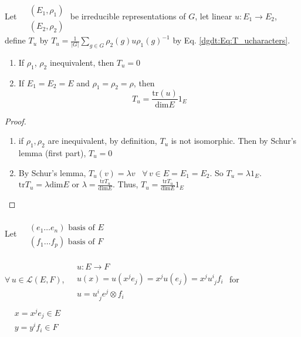 \begin{proposition}
	Let $\begin{aligned}
	& \quad \\
	& (E_1,\rho_1) \\
	& (E_2,\rho_2) \end{aligned}$ be irreducible representations of $G$, let linear $u:E_1 \to E_2$, define $T_u$ by $T_u = \frac{1}{ |G|} \sum_{g\in G} \rho_2(g) u \rho_1(g)^{-1}$ by Eq. \ref{dgdt:Eq:T_ucharacters}.  
	
	\begin{enumerate}
		\item[(i)] If $\rho_1$, $\rho_2$ inequivalent, then $T_u=0$
		\item[(ii)] If $E_1=E_2= E$ and $\rho_1 = \rho_2 = \rho$, then
		\[
		T_u = \frac{\text{tr}{(u)}}{ \text{dim}E} 1_E
		\]
	\end{enumerate}
\end{proposition}

\begin{proof}
	\begin{enumerate}
		\item[(i)] if $\rho_1,\rho_2$ are inequivalent, by definition, $T_u$ is not isomorphic.  Then by Schur's lemma (first part), $T_u=0$
		\item[(ii)] By Schur's lemma, $T_u(v) = \lambda v$ \, $\forall \, v \in E = E_1 = E_2$.  So $T_u = \lambda 1_E$.  $\text{tr}T_u = \lambda \text{dim}E$ or $\lambda = \frac{ \text{tr}T_u}{ \text{dim}E}$.  Thus, $T_u = \frac{\text{tr}{T_u}}{ \text{dim}E}1_E$
	\end{enumerate}
\end{proof}

Let $\begin{aligned} & \quad \\
& (e_1 \dots e_n) \text{ basis of $E$ } \\
& (f_1 \dots f_p) \text{ basis of $F$ } \end{aligned}$ 

$\forall \, u \in \mathcal{L}(E,F)$, $\begin{aligned} & \quad \\
& u : E \to F \\
& u(x) = u(x^j e_j) = x^ju(e_j) = x^ju^i_{ \,\, j}f_i \\
& u = u^i_{ \,\, j} e^j \otimes f_i \end{aligned}$ for $\begin{aligned} & \quad \\ 
& x = x^j e_j \in E \\
& y = y^i f_i \in F \end{aligned}$


